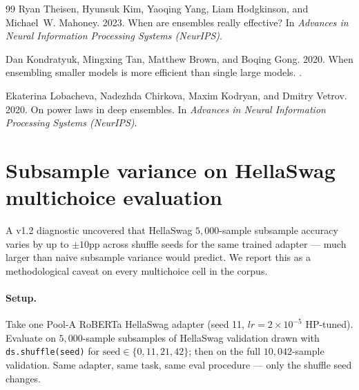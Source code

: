 \documentclass[11pt]{article}
\begin{document}
\begin{thebibliography}{99}
Ryan Theisen, Hyunsuk Kim, Yaoqing Yang, Liam Hodgkinson, and Michael~W. Mahoney. 2023.
\newblock When are ensembles really effective?
\newblock In {\em Advances in Neural Information Processing Systems (NeurIPS)}.

Dan Kondratyuk, Mingxing Tan, Matthew Brown, and Boqing Gong. 2020.
\newblock When ensembling smaller models is more efficient than single large models.
.

Ekaterina Lobacheva, Nadezhda Chirkova, Maxim Kodryan, and Dmitry Vetrov. 2020.
\newblock On power laws in deep ensembles.
\newblock In {\em Advances in Neural Information Processing Systems (NeurIPS)}.
\end{thebibliography}

\appendix
\makeatletter
\renewcommand\thesection{%
  \ifnum\value{section}>26 A\@Alph{\numexpr\value{section}-26\relax}%
  \else\@Alph\c@section\fi}
\makeatother
\sloppy

\section{Subsample variance on HellaSwag multichoice evaluation}\label{app:splitvar}

A v1.2 diagnostic uncovered that HellaSwag $5{,}000$-sample subsample accuracy varies by up to $\pm 10$pp across shuffle seeds for the same trained adapter --- much larger than naive subsample variance would predict. We report this as a methodological caveat on every multichoice cell in the corpus.

\paragraph{Setup.} Take one Pool-A RoBERTa HellaSwag adapter (seed 11, $lr{=}2{\times}10^{-5}$ HP-tuned). Evaluate on $5{,}000$-sample subsamples of HellaSwag validation drawn with \texttt{ds.\allowbreak shuffle(seed)} for $\text{seed}\!\in\!\{0, 11, 21, 42\}$; then on the full $10{,}042$-sample validation. Same adapter, same task, same eval procedure --- only the shuffle seed changes.
\end{document}
